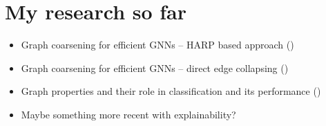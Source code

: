 \chapter{My research so far}
\label{chap:my-research}

\begin{itemize}
	\item Graph coarsening for efficient GNNs -- HARP based approach (\cite{dedic_balancing_2023, dedic_balancing_2024})
	\item Graph coarsening for efficient GNNs -- direct edge collapsing (\cite{prochazka_scalable_2022})
	\item Graph properties and their role in classification and its performance (\cite{prochazka_which_2023})
	\item Maybe something more recent with explainability?
\end{itemize}
